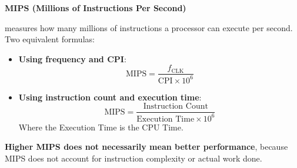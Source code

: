 \begin{flushleft}
  \textcolor{Green3}{ \textbf{MIPS (Millions of Instructions Per Second)}}
\end{flushleft}
 measures how many millions of instructions a processor can execute per second. Two equivalent formulas:
\begin{itemize}
  \item \textbf{Using frequency and CPI}:
  \begin{equation}
    \text{MIPS} = \dfrac{f_{\text{CLK}}}{\text{CPI} \times 10^6}
  \end{equation}
  \item \textbf{Using instruction count and execution time}:
  \begin{equation}
    \text{MIPS} = \frac{\text{Instruction Count}}{\text{Execution Time} \times 10^{6}}
  \end{equation}
  Where the Execution Time is the CPU Time.
\end{itemize}
\textbf{Higher MIPS does not necessarily mean better performance}, because MIPS does not account for instruction complexity or actual work done.